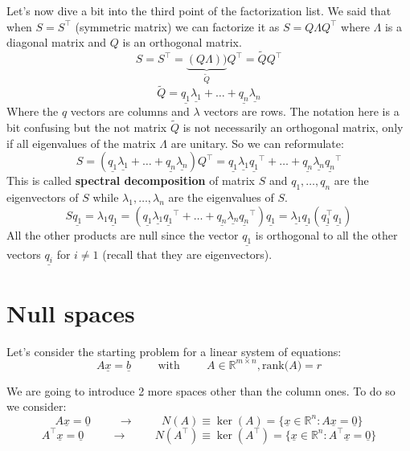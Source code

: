 Let's now dive a bit into the third point of the factorization list. We said that when $S = S^\intercal$ (symmetric matrix) we can factorize it as $S = Q\Lambda Q^\intercal$ where $\Lambda$ is a diagonal matrix and $Q$ is an orthogonal matrix.\\
\[
S = S^\intercal = \underbrace{(Q\Lambda))}_{\tilde{Q}}Q^\intercal = \tilde{Q}Q^\intercal   
\]
\[
\tilde{Q} = \underline{q_1}\underline{\lambda_1} + \dots + \underline{q_n}\underline{\lambda_n}    
\]
Where the $q$ vectors are columns and $\lambda$ vectors are rows. The notation here is a bit confusing but the not matrix $\tilde{Q}$ is not necessarily an orthogonal matrix, only if all eigenvalues of the matrix $\Lambda$ are unitary.
So we can reformulate:
\[
    S = (\underline{q_1}\underline{\lambda_1} + \dots + \underline{q_n}\underline{\lambda_n})Q^\intercal = \underline{q_1}\underline{\lambda_1}\underline{q_1}^\intercal + \dots + \underline{q_n}\underline{\lambda_n}\underline{q_n}^\intercal
\]
This is called \textbf{spectral decomposition} of matrix $S$ and $q_1, \dots, q_n$ are the eigenvectors of $S$ while $\lambda_1, \dots, \lambda_n$ are the eigenvalues of $S$.
\[
    S\underline{q_1} = \lambda_1\underline{q_1} = (\underline{q_1}\underline{\lambda_1}\underline{q_1}^\intercal + \dots + \underline{q_n}\underline{\lambda_n}\underline{q_n}^\intercal)\underline{q_1} = 
    \underline{\lambda_1}\underline{q_1}(\underline{q_1^\intercal}\underline{q_1})
    \]
All the other products are null since the vector $\underline{q_1}$ is orthogonal to all the other vectors $\underline{q_i}$ for $i \neq 1$ (recall that they are eigenvectors).

\section{Null spaces}
Let's consider the starting problem for a linear system of equations:
\[
A\underline{x} = \underline{b} \hspace{1cm} \text{with} \hspace{1cm} A\in \mathbb{R}^{m \times n}, \text{rank($A$)}=r    
\]

We are going to introduce 2 more spaces other than the column ones. To do so we consider:
\[
  A\underline{x} = \underline{0} \hspace{1cm} \rightarrow \hspace{1cm} N(A) \equiv \ker(A) = \{\underline{x} \in \mathbb{R}^n : A\underline{x} = \underline{0}\}  
\]
\[
    A^\intercal\underline{x} = \underline{0} \hspace{1cm} \rightarrow \hspace{1cm} N(A^\intercal) \equiv \ker(A^\intercal) = \{\underline{x} \in \mathbb{R}^n : A^\intercal\underline{x} = \underline{0}\}    
\]

